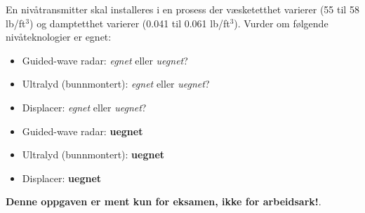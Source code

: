 

En nivåtransmitter skal installeres i en prosess der væsketetthet varierer (55 til 58 lb/ft$^{3}$) og damptetthet varierer (0.041 til 0.061 lb/ft$^{3}$). Vurder om følgende nivåteknologier er egnet:

\begin{itemize}
\item{} Guided-wave radar: {\it egnet} eller {\it uegnet}?
\vskip 10pt
\item{} Ultralyd (bunnmontert): {\it egnet} eller {\it uegnet}?
\vskip 10pt
\item{} Displacer: {\it egnet} eller {\it uegnet}?
\end{itemize}







\begin{itemize}
\item{} Guided-wave radar: {\bf uegnet}
\vskip 10pt
\item{} Ultralyd (bunnmontert): {\bf uegnet}
\vskip 10pt
\item{} Displacer: {\bf uegnet}
\end{itemize}







{\bf Denne oppgaven er ment kun for eksamen, ikke for arbeidsark!}.


